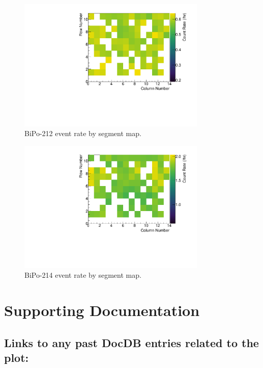 \begin{figure}[!bp]
	\centering
	\includegraphics[width=0.8\textwidth]{figures/BiPo1HeatMap.pdf}
	\caption{\label{fig:bipo212heatmap}BiPo-212 event rate by segment map.}
\end{figure}

\begin{figure}[!bp]
	\centering
	\includegraphics[width=0.8\textwidth]{figures/BiPo0HeatMap.pdf}
	\caption{\label{fig:bipo214heatmap}BiPo-214 event rate by segment map.}
\end{figure}
\clearpage
\newpage

\section{Supporting Documentation}

\subsection{Links to any past DocDB entries related to the plot:} 
\hspace{2in}
%
{}


